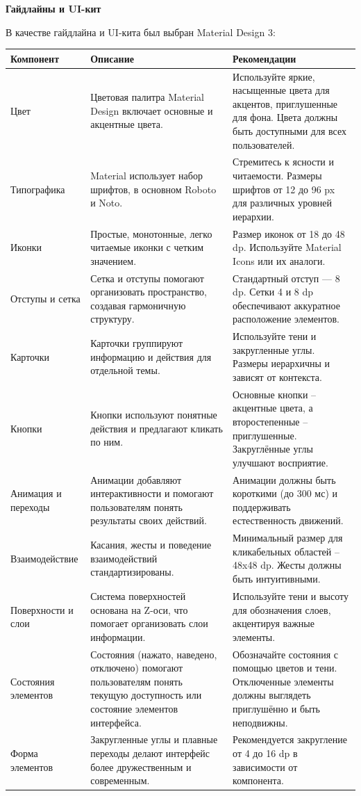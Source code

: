 \textbf{Гайдлайны и UI-кит}
\bigskip

В качестве гайдлайна и UI-кита был выбран Material Design 3:

\begin{table}[H]
    \small
    \begin{tabular}{|p{3cm}|p{5cm}|p{6cm}|}
\hline
\textbf{Компонент} & \textbf{Описание} & \textbf{Рекомендации} \\
\hline
Цвет & Цветовая палитра Material Design включает основные и акцентные цвета. & Используйте яркие, насыщенные цвета для акцентов, приглушенные для фона. Цвета должны быть доступными для всех пользователей. \\
\hline
Типографика & Material использует набор шрифтов, в основном Roboto и Noto. & Стремитесь к ясности и читаемости. Размеры шрифтов от 12 до 96 px для различных уровней иерархии. \\
\hline
Иконки & Простые, монотонные, легко читаемые иконки с четким значением. & Размер иконок от 18 до 48 dp. Используйте Material Icons или их аналоги. \\
\hline
Отступы и сетка & Сетка и отступы помогают организовать пространство, создавая гармоничную структуру. & Стандартный отступ — 8 dp. Сетки 4 и 8 dp обеспечивают аккуратное расположение элементов. \\
\hline
Карточки & Карточки группируют информацию и действия для отдельной темы. & Используйте тени и закругленные углы. Размеры иерархичны и зависят от контекста. \\
\hline
Кнопки & Кнопки используют понятные действия и предлагают кликать по ним. & Основные кнопки – акцентные цвета, а второстепенные – приглушенные. Закруглённые углы улучшают восприятие. \\
\hline
Анимация и переходы & Анимации добавляют интерактивности и помогают пользователям понять результаты своих действий. & Анимации должны быть короткими (до 300 мс) и поддерживать естественность движений. \\
\hline
Взаимодействие & Касания, жесты и поведение взаимодействий стандартизированы. & Минимальный размер для кликабельных областей – 48x48 dp. Жесты должны быть интуитивными. \\
\hline
Поверхности и слои & Система поверхностей основана на Z-оси, что помогает организовать слои информации. & Используйте тени и высоту для обозначения слоев, акцентируя важные элементы. \\
\hline
Состояния элементов & Состояния (нажато, наведено, отключено) помогают пользователям понять текущую доступность или состояние элементов интерфейса. & Обозначайте состояния с помощью цветов и тени. Отключенные элементы должны выглядеть приглушённо и быть неподвижны. \\
\hline
Форма элементов & Закругленные углы и плавные переходы делают интерфейс более дружественным и современным. & Рекомендуется закругление от 4 до 16 dp в зависимости от компонента. \\
\hline
\end{tabular}
\end{table}

